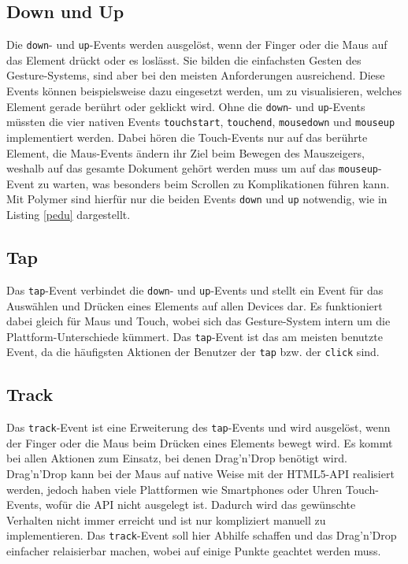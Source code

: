 \subsection{Down und Up}\label{down-und-up}

Die \texttt{down}- und \texttt{up}-Events werden ausgelöst, wenn der Finger oder die Maus auf das Element drückt oder es loslässt. Sie bilden die einfachsten Gesten des Gesture-Systems, sind aber bei den meisten Anforderungen ausreichend. Diese Events können beispielsweise dazu eingesetzt werden, um zu visualisieren, welches Element gerade berührt oder geklickt wird. Ohne die \texttt{down}- und \texttt{up}-Events müssten die vier nativen Events \texttt{touchstart}, \texttt{touchend}, \texttt{mousedown} und \texttt{mouseup} implementiert werden. Dabei hören die Touch-Events nur auf das berührte Element, die Maus-Events ändern ihr Ziel beim Bewegen des Mauszeigers, weshalb auf das gesamte Dokument gehört werden muss um auf das \texttt{mouseup}-Event zu warten, was besonders beim Scrollen zu Komplikationen führen kann. Mit Polymer sind hierfür nur die beiden Events \texttt{down} und \texttt{up} notwendig, wie in Listing \ref{pedu} dargestellt.




\subsection{Tap}\label{tap}

Das \texttt{tap}-Event verbindet die \texttt{down}- und \texttt{up}-Events und stellt ein Event für das Auswählen und Drücken eines Elements auf allen Devices dar. Es funktioniert dabei gleich für Maus und Touch, wobei sich das Gesture-System intern um die Plattform-Unterschiede kümmert. Das \texttt{tap}-Event ist das am meisten benutzte Event, da die häufigsten Aktionen der Benutzer der \texttt{tap} bzw. der \texttt{click} sind.


\subsection{Track}\label{track}

Das \texttt{track}-Event ist eine Erweiterung des \texttt{tap}-Events und wird ausgelöst, wenn der Finger oder die Maus beim Drücken eines Elements bewegt wird. Es kommt bei allen Aktionen zum Einsatz, bei denen Drag'n'Drop benötigt wird. Drag'n'Drop kann bei der Maus auf native Weise mit der \ac{HTML}5-\ac{API} realisiert werden, jedoch haben viele Plattformen wie Smartphones oder Uhren Touch-Events, wofür die \ac{API} nicht ausgelegt ist. Dadurch wird das gewünschte Verhalten nicht immer erreicht und ist nur kompliziert manuell zu implementieren. Das \texttt{track}-Event soll hier Abhilfe schaffen und das Drag'n'Drop einfacher relaisierbar machen, wobei auf einige Punkte geachtet werden muss.

